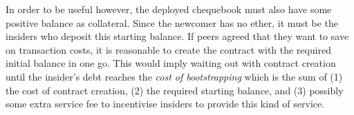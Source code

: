 In order to be useful however, the deployed chequebook must also have some positive balance as collateral. Since the newcomer has no ether, it must be the insiders who deposit this starting balance. If peers agreed that they want to save on transaction costs, it is reasonable to create the contract with the required initial balance in one go. This would imply waiting out with contract creation until the insider's debt reaches the \emph{cost of bootstrapping} which is the sum of (1) the cost of contract creation, (2) the required starting balance, and (3) possibly some extra service fee to incentivise insiders to provide this kind of service.
% 
% 
% 
% 
